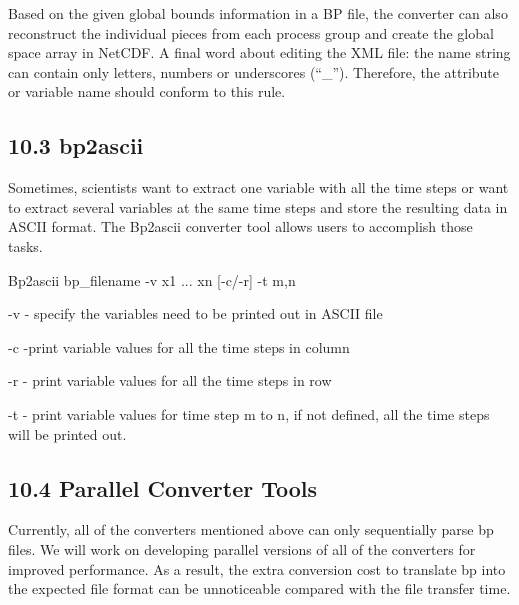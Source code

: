 \vspace{10pt}
Based on the given global bounds information in a BP file, the converter can also 
reconstruct the individual pieces from each process group and create the global 
space array in NetCDF. A final word about editing the XML file: the name string 
can contain only letters, numbers or underscores (``\_''). Therefore, the attribute 
or variable name should conform to this rule. \label{HToc84890284}\label{HToc212016660}\label{HToc212016902}\label{HToc82067532}\label{HToc182553433}

\vspace{10pt}
\subsection*{{\large 10.3 }{\large \textbf{bp2ascii}}}

\vspace{10pt}
Sometimes, scientists want to extract one variable with all the time steps or want 
to extract several variables at the same time steps and store the resulting data 
in ASCII format. The Bp2ascii converter tool allows users to accomplish those tasks. 

\vspace{10pt}
Bp2ascii bp\_filename -v x1 ... xn [-c/-r] -t m,n

\vspace{10pt}
-v - specify the variables need to be printed out in ASCII file

\vspace{10pt}
-c -print variable values for all the time steps in column

\vspace{10pt}
-r - print variable values for all the time steps in row

\vspace{10pt}
-t - print variable values for time step m to n,  if not defined, all the time 
steps will be printed out.

\vspace{10pt}
\subsection*{{\large 10.4 }{\large \textbf{ \label{HToc84890285}\label{HToc212016661}\label{HToc212016903}\label{HToc182553434}Parallel 
Converter Tools}}}

\vspace{10pt}
Currently, all of the converters mentioned above can only sequentially parse bp 
files. We will work on developing parallel versions of all of the converters for 
improved performance. As a result, the extra conversion cost to translate bp into 
the expected file format can be unnoticeable compared with the file transfer time. 
 \label{HToc84890286}\label{HToc212016662}\label{HToc212016904}\label{HToc182553435}
